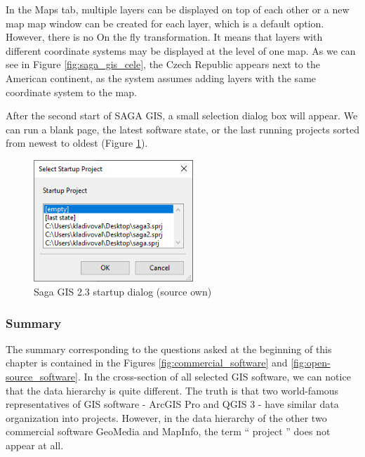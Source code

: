 \documentclass[a4paper,10pt,twoside]{article}
\begin{document}
In the Maps tab, multiple layers can be displayed on top of each other or a new map map window can be created for each layer, which is a default option. However, there is no On the fly transformation. It means that layers with different coordinate systems may be displayed at the level of one map.  As we can see in Figure \ref{fig:saga_gis_cele}, the Czech Republic appears next to the American continent, as the system assumes adding layers with the same coordinate system to the map.

After the second start of SAGA GIS, a small selection dialog box will appear. We can run a blank page, the latest software state, or the last running projects sorted from newest to oldest (Figure \ref{fig:saga_startup}).

\vspace{0.3cm}
\begin{figure}[hbt!] 
\begin{center}
\includegraphics[width=6cm]{../pictures/saga_startup.png} 
\caption[Saga GIS 2.3 startup dialog (source own)]{Saga GIS 2.3 startup dialog (source own)}
\label{fig:saga_startup}
\end{center}
\end{figure}

\vspace*{-1cm} 
\subsubsection{Summary}
\label{subsec:startup_concepts_summary}

The summary corresponding to the questions asked at the beginning of this chapter is contained in the Figures \ref{fig:commercial_software} and \ref{fig:open-source_software}. In the cross-section of all selected GIS software, we can notice that the data hierarchy is quite different. The truth is that two world-famous representatives of GIS software - ArcGIS Pro and QGIS 3 -  have similar data organization into projects. However, in the data hierarchy of the other two commercial software GeoMedia and MapInfo, the term `` project '' does not appear at all. 
\end{document}
